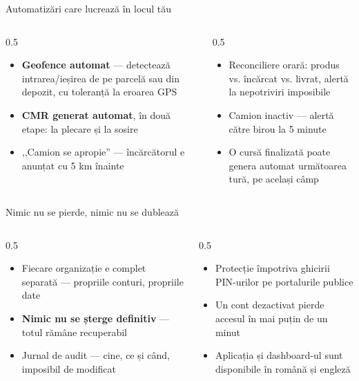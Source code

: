 \documentclass[aspectratio=169,10pt]{beamer}
\begin{document}
\begin{frame}{Automatizări care lucrează în locul tău}
  \vspace{0.3cm}
  \begin{columns}[T]
    \begin{column}{0.5\linewidth}
      \begin{itemize}
        \item \textbf{Geofence automat} — detectează intrarea/ieșirea de pe parcelă sau din depozit, cu toleranță la eroarea GPS
        \item \textbf{CMR generat automat}, în două etape: la plecare și la sosire
        \item ,,Camion se apropie'' — încărcătorul e anunțat cu 5 km înainte
      \end{itemize}
    \end{column}
    \begin{column}{0.5\linewidth}
      \begin{itemize}
        \item Reconciliere orară: produs vs. încărcat vs. livrat, alertă la nepotriviri imposibile
        \item Camion inactiv — alertă către birou la 5 minute
        \item O cursă finalizată poate genera automat următoarea tură, pe același câmp
      \end{itemize}
    \end{column}
  \end{columns}
\end{frame}

\begin{frame}{Nimic nu se pierde, nimic nu se dublează}
  \vspace{0.3cm}
  \begin{columns}[T]
    \begin{column}{0.5\linewidth}
      \begin{itemize}
        \item Fiecare organizație e complet separată — propriile conturi, propriile date
        \item \textbf{Nimic nu se șterge definitiv} — totul rămâne recuperabil
        \item Jurnal de audit — cine, ce și când, imposibil de modificat
      \end{itemize}
    \end{column}
    \begin{column}{0.5\linewidth}
      \begin{itemize}
        \item Protecție împotriva ghicirii PIN-urilor pe portalurile publice
        \item Un cont dezactivat pierde accesul în mai puțin de un minut
        \item Aplicația și dashboard-ul sunt disponibile în română și engleză
      \end{itemize}
    \end{column}
  \end{columns}
\end{frame}
\end{document}
